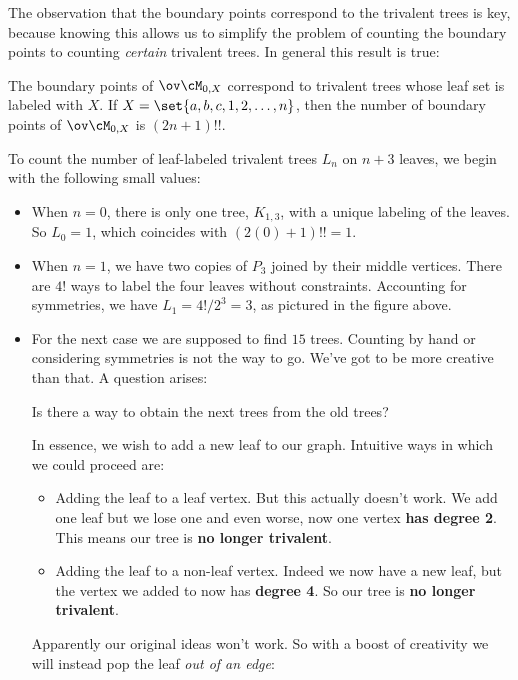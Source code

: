 \documentclass[12pt]{memoir}
\begin{document}
    The observation that the boundary points correspond to the trivalent trees is key, because knowing this allows us to simplify the problem of counting the boundary points to counting \emph{certain} trivalent trees. In general this result is true:
    
    \begin{Prop}
        The boundary points of $\ov\cM_{0,X}$ correspond to trivalent trees whose leaf set is labeled with $X$. If $X=\set{a,b,c,1,2,\dots,n}$, then the number of boundary points of $\ov\cM_{0,X}$ is $(2n+1)!!$. 
    \end{Prop}
    
    To count the number of leaf-labeled trivalent trees $L_n$ on $n+3$ leaves, we begin with the following small values:
    \begin{itemize}
        \item When $n=0$, there is only one tree, $K_{1,3}$, with a unique labeling of the leaves. So $L_0=1$, which coincides with $(2(0)+1)!!=1$.
        \item When $n=1$, we have two copies of $P_3$ joined by their middle vertices. There are $4!$ ways to label the four leaves without constraints. Accounting for symmetries, we have $L_1=4!/2^3=3$, as pictured in the figure above.
        \item For the next case we are supposed to find $15$ trees. Counting by hand or considering symmetries is not the way to go. We've got to be more creative than that. A question arises:
        \begin{significant}
            Is there a way to obtain the next trees from the old trees?
        \end{significant}
        In essence, we wish to add a new leaf to our graph. Intuitive ways in which we could proceed are:
        \begin{itemize}
            \item Adding the leaf to a leaf vertex. But this actually doesn't work. We add one leaf but we lose one and even worse, now one vertex \textbf{has degree 2}. This means our tree is \textbf{no longer trivalent}.
            \item Adding the leaf to a non-leaf vertex. Indeed we now have a new leaf, but the vertex we added to now has \textbf{degree 4}. So our tree is \textbf{no longer trivalent}.
        \end{itemize}
        Apparently our original ideas won't work. So with a boost of creativity we will instead pop the leaf \emph{out of an edge}:\par

\end{itemize}
\end{document}
